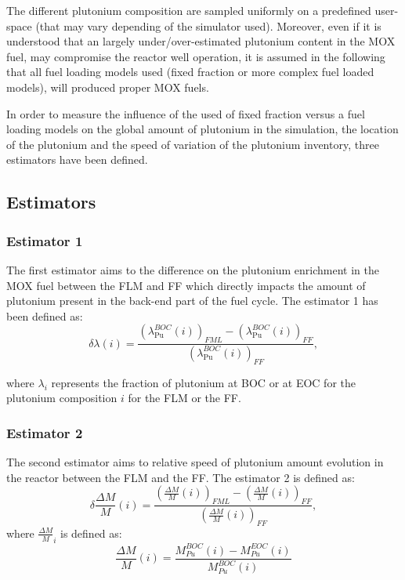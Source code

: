 The different plutonium composition are sampled uniformly on a predefined
user-space (that may vary depending of the simulator used). Moreover, even if
it is understood that an largely under/over-estimated plutonium content in the
MOX fuel, may compromise the reactor well operation, it is assumed in the
following that all fuel loading models used (fixed fraction or more complex fuel
loaded models), will produced proper MOX fuels.

In order to measure the influence of the used of fixed fraction versus a fuel
loading models on the global amount of plutonium in the simulation, the location
of the plutonium and the speed of variation of the plutonium inventory, three
estimators have been defined.

\subsection{Estimators}
\subsubsection{Estimator 1}
The first estimator aims to the difference on the plutonium enrichment in the MOX
fuel between the \gls{FLM} and \gls{FF} which directly impacts the amount of
plutonium present in the back-end part of the fuel cycle. The estimator 1 has
been defined as:
\begin{equation}
    \delta{\lambda}(i) =
        \frac{\left(\lambda_{\mathrm{Pu}}^{BOC}(i)\right)_{FML}
              - \left(\lambda_{\mathrm{Pu}}^{BOC}(i)\right)_{FF}}
              {\left(\lambda_{\mathrm{Pu}}^{BOC}(i)\right)_{FF}},
\end{equation}

where $\lambda_i$ represents the fraction of plutonium at \gls{BOC} or at
\gls{EOC} for the plutonium composition $i$ for the \gls{FLM} or the \gls{FF}.

\subsubsection{Estimator 2}
The second estimator aims to relative speed of plutonium amount evolution in the
reactor between the \gls{FLM} and the \gls{FF}. The estimator 2 is defined as:
\begin{equation}
    \delta{\frac{\Delta M}{M}}(i) =
        \frac{\left(\frac{\Delta M}{M}(i)\right)_{FML}
              - \left(\frac{\Delta M}{M}(i)\right)_{FF}}
             {\left(\frac{\Delta M}{M}(i)\right)_{FF}},
\end{equation}
where $\frac{\Delta M}{M}_{i}$ is defined as:
\begin{equation}
    \frac{\Delta M}{M}(i) = \frac{M_{Pu}^{BOC}(i) -
    M_{Pu}^{EOC}(i)}{M_{Pu}^{BOC}(i)}
\end{equation}


